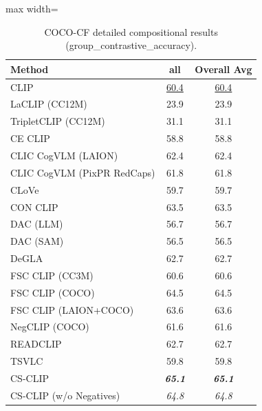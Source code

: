 \begin{table}[t]
  \centering
  \scriptsize
  \caption{COCO-CF detailed compositional results (group_contrastive_accuracy).}
  \label{tab:COCO-CF_detailed}
  \begin{adjustbox}{max width=\textwidth}
  \setlength{\tabcolsep}{2pt}
  \begin{tabular}{p{5cm}c|c}
    \toprule
    Method & all & Overall Avg \\
    \midrule
    CLIP & \underline{60.4} & \underline{60.4} \\
    \midrule
    LaCLIP (CC12M) & 23.9 & 23.9 \\
    TripletCLIP (CC12M) & 31.1 & 31.1 \\
    \midrule
    CE CLIP & 58.8 & 58.8 \\
    CLIC CogVLM (LAION) & 62.4 & 62.4 \\
    CLIC CogVLM (PixPR RedCaps) & 61.8 & 61.8 \\
    CLoVe & 59.7 & 59.7 \\
    CON CLIP & 63.5 & 63.5 \\
    DAC (LLM) & 56.7 & 56.7 \\
    DAC (SAM) & 56.5 & 56.5 \\
    DeGLA & 62.7 & 62.7 \\
    FSC CLIP (CC3M) & 60.6 & 60.6 \\
    FSC CLIP (COCO) & 64.5 & 64.5 \\
    FSC CLIP (LAION+COCO) & 63.6 & 63.6 \\
    NegCLIP (COCO) & 61.6 & 61.6 \\
    READCLIP & 62.7 & 62.7 \\
    TSVLC & 59.8 & 59.8 \\
    \midrule
    CS-CLIP & \emph{\textbf{65.1}} & \emph{\textbf{65.1}} \\
    CS-CLIP (w/o Negatives) & \emph{64.8} & \emph{64.8} \\
    \bottomrule
  \end{tabular}
  \end{adjustbox}
\end{table}

